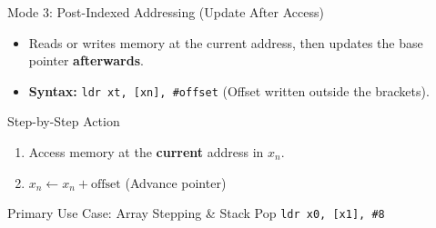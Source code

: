 \documentclass[aspectratio=169,11pt,t]{beamer}
\newcommand{\key}[1]{\textbf{#1}}
\newcommand{\code}[1]{\texttt{#1}}
\begin{document}

\begin{frame}{Mode 3: Post-Indexed Addressing (Update After Access)}

\begin{itemize}\setlength{\itemsep}{5pt}
  \item Reads or writes memory at the current address, then updates the base pointer \key{afterwards}.
  \item \key{Syntax:} \code{ldr xt, [xn], \#offset} \quad (Offset written outside the brackets).
\end{itemize}

\vspace{0.2cm}
\begin{block}{Step-by-Step Action}
\begin{enumerate}\setlength{\itemsep}{3pt}
  \item Access memory at the \key{current} address in $x_n$.
  \item $x_n \leftarrow x_n + \text{offset}$ \quad (Advance pointer)
\end{enumerate}
\end{block}

\vspace{0.25cm}
\begin{block}{Primary Use Case: Array Stepping \& Stack Pop}
\code{ldr x0, [x1], \#8} \\
\end{block}
\end{frame}

\end{document}
